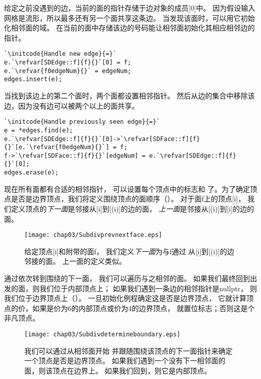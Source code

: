 给定之前没遇到的边，当前的面的指针存储于边对象的成员{\ttfamily{}[0]}中。
因为假设输入网格是流形，所以最多还有另一个面共享这条边。
当发现该面时，可以用它初始化相邻面的域。
在当前的面中存储该边的号码能让相邻面初始化其相应相邻边的指针。
\begin{lstlisting}
`\initcode{Handle new edge}{=}`
e.`\refvar[SDEdge::f]{f}{}`[0] = f;
e.`\refvar{f0edgeNum}{}` = edgeNum;
edges.insert(e);
\end{lstlisting}

当找到该边上的第二个面时，两个面都设置相邻指针。
然后从边的集合中移除该边，因为没有边可以被两个以上的面共享。
\begin{lstlisting}
`\initcode{Handle previously seen edge}{=}`
e = *edges.find(e);
e.`\refvar[SDEdge::f]{f}{}`[0]->`\refvar[SDFace::f]{f}{}`[e.`\refvar{f0edgeNum}{}`] = f;
f->`\refvar[SDFace::f]{f}{}`[edgeNum] = e.`\refvar[SDEdge::f]{f}{}`[0];
edges.erase(e);
\end{lstlisting}

现在所有面都有合适的相邻指针，
可以设置每个顶点中的标志和
了。为了确定顶点是否是边界顶点，我们将定义围绕顶点的面顺序（）。
对于面{\ttfamily f}上的顶点{\ttfamily{}[i]}，
我们定义顶点的\emph{下一面}是邻接从{\ttfamily{}[i]}到{\ttfamily{}[(i)]}的边的面，
\emph{上一面}是邻接从{\ttfamily{}[(i)]}到{\ttfamily{}[i]}的边的面。
\begin{figure}[htbp]
    \centering\texttt{[image: chap03/Subdivprevnextface.eps]}
    \caption{给定顶点{\ttfamily{}[i]}和附带的面{\ttfamily f}，
    我们定义\emph{下一面}为与{\ttfamily f}通过
    从{\ttfamily\protect{}[i]}到{\ttfamily\protect{}[\protect{}(i)]}的边邻接的面。
    上一面的定义类似。}
    \label{fig:3.29}
\end{figure}

通过依次转到围绕的下一面，
我们可以遍历与之相邻的面。
如果我们最终回到出发的面，则我们位于内部顶点上；
如果我们遇到一条边的相邻指针是{\ttfamily nullptr}，
则我们位于边界顶点上（）。
一旦初始化例程确定这是否是边界顶点，
它就计算顶点的价，如果是价为6的内部顶点或价为4的边界顶点，
就置位标志；否则这是个非凡顶点。
\begin{figure}[htbp]
    \centering\texttt{[image: chap03/Subdivdetermineboundary.eps]}
    \caption{我们可以通过从相邻面\protect{}开始
        并跟随围绕该顶点的下一面指针来确定一个顶点是否是边界顶点。
        如果我们遇到一个没有下一相邻面的面，则该顶点在边界上。
        如果我们回到\protect{}，则它是内部顶点。}
    \label{fig:3.30}
\end{figure}

